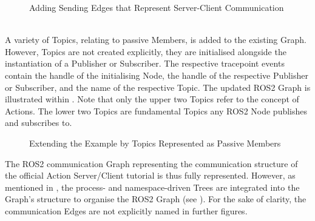 \begin{description}[leftmargin=\descriptionIndent, itemsep=-0.2em]
        \begin{figure}[h]
            \centering
            
            \caption[Adding Sending Edges that Represent Server-Client Communication]{Adding Sending Edges that Represent Server-Client Communication \circledLegend} \label{fig:neo4j:exemplarygraph:service}
        \end{figure}
        \item [4) Instantiating Topics] \hfill \\
        A variety of Topics, relating to passive Members, is added to the existing Graph. However, Topics are not created explicitly, they are initialised alongside the instantiation of a Publisher or Subscriber. The respective tracepoint events contain the handle of the initialising Node, the handle of the respective Publisher or Subscriber, and the name of the respective Topic. The updated ROS2 Graph is illustrated within . Note that only the upper two Topics refer to the concept of Actions. The lower two Topics are fundamental Topics any ROS2 Node publishes and subscribes to.
        \begin{figure}[h]
            \centering
            
            \caption[Extending the Example by Topics Represented as Passive Members]{Extending the Example by Topics Represented as Passive Members \circledLegend} \label{fig:neo4j:exemplarygraph:action}
        \end{figure} \enlargethispage{1\baselineskip}
        

        \hspace{-\descriptionIndent}\parbox{\textwidth}{The ROS2 communication Graph representing the communication structure of the official Action Server/Client tutorial is thus fully represented. However, as mentioned in , the process- and namespace-driven Trees are integrated into the Graph's structure to organise the ROS2 Graph (see ). For the sake of clarity, the communication Edges are not explicitly named in further figures.}


\end{description}
